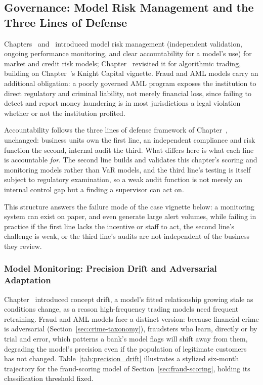 \documentclass[../ai_in_finance]{subfiles}
\begin{document}
\subsection{Governance: Model Risk Management and the Three Lines of Defense}
\label{sec:governance-3lod}

Chapters~ and~ introduced model risk management (independent validation, ongoing performance monitoring, and clear accountability for a model's use) for market and credit risk models; Chapter~ revisited it for algorithmic trading, building on Chapter~'s Knight Capital vignette. Fraud and AML models carry an additional obligation: a poorly governed AML program exposes the institution to direct regulatory and criminal liability, not merely financial loss, since failing to detect and report money laundering is in most jurisdictions a legal violation whether or not the institution profited.

Accountability follows the three lines of defense framework of Chapter~, unchanged: business units own the first line, an independent compliance and risk function the second, internal audit the third. What differs here is what each line is accountable \emph{for}. The second line builds and validates this chapter's scoring and monitoring models rather than VaR models, and the third line's testing is itself subject to regulatory examination, so a weak audit function is not merely an internal control gap but a finding a supervisor can act on.

This structure answers the failure mode of the case vignette below: a monitoring system can exist on paper, and even generate large alert volumes, while failing in practice if the first line lacks the incentive or staff to act, the second line's challenge is weak, or the third line's audits are not independent of the business they review.

\subsubsection*{Model Monitoring: Precision Drift and Adversarial Adaptation}

Chapter~ introduced concept drift, a model's fitted relationship growing stale as conditions change, as a reason high-frequency trading models need frequent retraining. Fraud and AML models face a distinct version: because financial crime is adversarial (Section~\ref{sec:crime-taxonomy}), fraudsters who learn, directly or by trial and error, which patterns a bank's model flags will shift away from them, degrading the model's precision even if the population of legitimate customers has not changed. Table~\ref{tab:precision_drift} illustrates a stylized six-month trajectory for the fraud-scoring model of Section~\ref{sec:fraud-scoring}, holding its classification threshold fixed.
\end{document}

